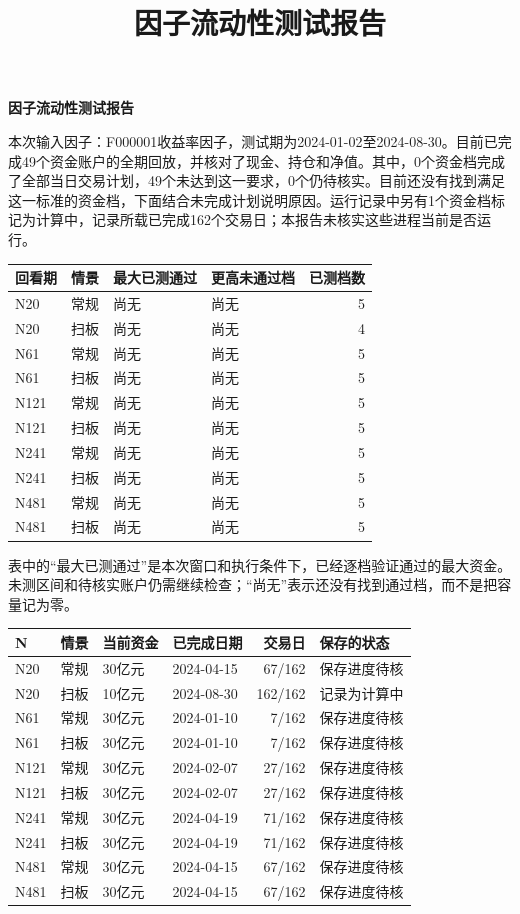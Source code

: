 \documentclass[UTF8,10pt,a4paper,fontset=fandol]{ctexart}
\title{因子流动性测试报告}\date{}\author{}
\begin{document}
{\Large\bfseries 因子流动性测试报告}\par
本次输入因子：F000001收益率因子，测试期为2024-01-02至2024-08-30。目前已完成49个资金账户的全期回放，并核对了现金、持仓和净值。其中，0个资金档完成了全部当日交易计划，49个未达到这一要求，0个仍待核实。目前还没有找到满足这一标准的资金档，下面结合未完成计划说明原因。运行记录中另有1个资金档标记为计算中，记录所载已完成162个交易日；本报告未核实这些进程当前是否运行。

\begin{table}[H]\centering\small
\begin{tabular}{llllr}\toprule
回看期 & 情景 & 最大已测通过 & 更高未通过档 & 已测档数\\\midrule
N20 & 常规 & 尚无 & 尚无 & 5 \\
N20 & 扫板 & 尚无 & 尚无 & 4 \\
N61 & 常规 & 尚无 & 尚无 & 5 \\
N61 & 扫板 & 尚无 & 尚无 & 5 \\
N121 & 常规 & 尚无 & 尚无 & 5 \\
N121 & 扫板 & 尚无 & 尚无 & 5 \\
N241 & 常规 & 尚无 & 尚无 & 5 \\
N241 & 扫板 & 尚无 & 尚无 & 5 \\
N481 & 常规 & 尚无 & 尚无 & 5 \\
N481 & 扫板 & 尚无 & 尚无 & 5 \\
\bottomrule\end{tabular}
\end{table}
表中的“最大已测通过”是本次窗口和执行条件下，已经逐档验证通过的最大资金。未测区间和待核实账户仍需继续检查；“尚无”表示还没有找到通过档，而不是把容量记为零。

\begin{table}[H]\centering\small\begin{tabular}{llllrl}\toprule N & 情景 & 当前资金 & 已完成日期 & 交易日 & 保存的状态\\\midrule N20 & 常规 & 30亿元 & 2024-04-15 & 67/162 & 保存进度待核 \\
N20 & 扫板 & 10亿元 & 2024-08-30 & 162/162 & 记录为计算中 \\
N61 & 常规 & 30亿元 & 2024-01-10 & 7/162 & 保存进度待核 \\
N61 & 扫板 & 30亿元 & 2024-01-10 & 7/162 & 保存进度待核 \\
N121 & 常规 & 30亿元 & 2024-02-07 & 27/162 & 保存进度待核 \\
N121 & 扫板 & 30亿元 & 2024-02-07 & 27/162 & 保存进度待核 \\
N241 & 常规 & 30亿元 & 2024-04-19 & 71/162 & 保存进度待核 \\
N241 & 扫板 & 30亿元 & 2024-04-19 & 71/162 & 保存进度待核 \\
N481 & 常规 & 30亿元 & 2024-04-15 & 67/162 & 保存进度待核 \\
N481 & 扫板 & 30亿元 & 2024-04-15 & 67/162 & 保存进度待核 \\\bottomrule\end{tabular}\end{table}
\end{document}
